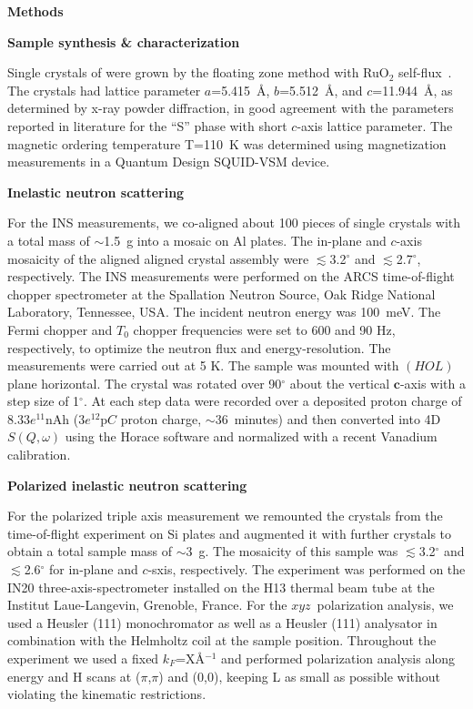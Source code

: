 
\vspace{20 pt}
\noindent
{\bf Methods}

\vspace{10 pt}
\noindent
{\bf Sample synthesis \& characterization}

\noindent
%
Single crystals of \CRO were grown by the floating zone method with RuO$_{2}$
self-flux~\cite{Nakatsuji97,Cao97}. The crystals had lattice parameter
$a$=5.415~\r{A}, $b$=5.512~\r{A}, and $c$=11.944~\r{A}, as determined by x-ray
powder diffraction, in good agreement with the parameters reported in
literature\cite{} for the ``S'' phase with short $c$-axis lattice parameter.
The magnetic ordering temperature T=110~K was determined using magnetization
measurements in a Quantum Design SQUID-VSM device.

\vspace{10 pt}
\noindent
{\bf Inelastic neutron scattering}

\noindent
%
For the INS measurements, we co-aligned about 100 pieces of single crystals
with a total mass of $\sim$1.5~g into a mosaic on Al plates. The in-plane and
$c$-axis mosaicity of the aligned aligned crystal assembly were
$\lesssim$3.2$^\circ$ and  $\lesssim$2.7$^\circ$, respectively. The INS
measurements were performed on the ARCS time-of-flight chopper spectrometer at
the Spallation Neutron Source, Oak Ridge National Laboratory, Tennessee, USA.
The incident neutron energy was 100~meV. The Fermi chopper and  $T_{0}$ chopper
frequencies were set to 600 and 90 Hz, respectively, to optimize the neutron
flux and energy-resolution. The measurements were carried out at 5 K. The
sample was mounted with $(HOL)$ plane horizontal. The crystal was rotated over
90$^\circ$  about the vertical $\mathbf{c}$-axis with a step size of 1$^\circ$.
At each step data were recorded over a deposited proton charge of $8.33
e^{11}$nAh ($3 e^{12}$p$C$ proton charge, $\sim 36$~minutes)
and then converted into 4D $S(Q,\omega)$ using the Horace software\cite{horace}
and normalized with a recent Vanadium calibration.

\vspace{10 pt}
\noindent
{\bf Polarized inelastic neutron scattering}

\noindent
%
For the polarized triple axis measurement we remounted the crystals from the
time-of-flight experiment on Si plates and augmented it with further crystals
to obtain a total sample mass of $\sim$3~g.
%
The mosaicity of this sample was $\lesssim$3.2$^\circ$ and 
$\lesssim$2.6$^\circ$ for in-plane and $c$-sxis, respectively.
%
The experiment was performed on the IN20 three-axis-spectrometer installed on
the H13 thermal beam tube at the Institut Laue-Langevin, Grenoble, France. For
the $xyz$~polarization analysis, we used a Heusler (111) monochromator as well
as a Heusler (111) analysator in combination with the Helmholtz coil at the
sample position.
%
Throughout the experiment we used a fixed $k_F$=X\r{A}$^{-1}$ and performed
polarization analysis along energy and H scans at ($\pi$,$\pi$) and (0,0),
keeping L as small as possible without violating the kinematic restrictions.



